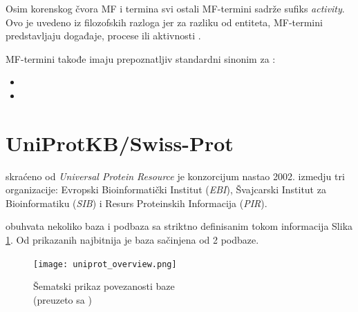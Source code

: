 Osim korenskog čvora MF i  termina svi ostali MF-termini sadrže sufiks \textit{activity}.
Ovo je uvedeno iz filozofskih razloga jer za razliku od entiteta, MF-termini predstavljaju događaje, procese ili aktivnosti \parencite{go_mf}.

MF-termini takođe imaju prepoznatljiv standardni sinonim za  \parencite{go_mf}:
\begin{itemize}
  \item {}
  \item {}
\end{itemize}


\section{UniProtKB/Swiss-Prot}
\label{svis-prot}

\keyword{\uniprot} skraćeno od \textit{Universal Protein Resource} je konzorcijum
nastao 2002. izmedju tri organizacije: Evropski Bioinformatički
Institut (\textit{EBI}), Švajcarski Institut za Bioinformatiku (\textit{SIB}) i Resurs
Proteinskih Informacija (\textit{PIR}).  


\uniprot obuhvata nekoliko baza i podbaza sa striktno definisanim tokom
informacija Slika \ref{fig:uniprot_overview}. Od prikazanih najbitnija je baza
\keyword{\uniprotkb}  sačinjena od 2 podbaze.

\begin{figure}[h!]
  \centering
  \texttt{[image: uniprot\_overview.png]}
  \caption{Šematski prikaz povezanosti \uniprot baze\\ \footnotesize (preuzeto sa \parencite{uniprot_veb})}
  \label{fig:uniprot_overview}
\end{figure}


